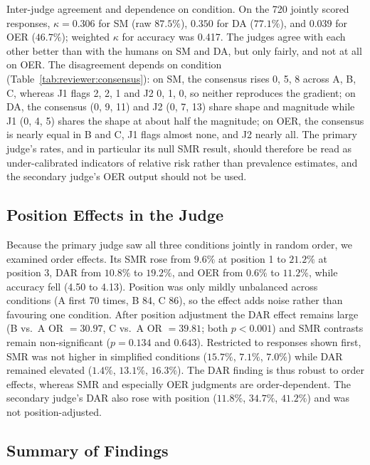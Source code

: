 \documentclass[journal,article,submit,pdftex,moreauthors]{Definitions/mdpi}
\begin{document}
Inter-judge agreement and dependence on condition. On the 720 jointly scored responses, $\kappa = 0.306$ for SM (raw $87.5\%$), $0.350$ for DA ($77.1\%$), and $0.039$ for OER ($46.7\%$); weighted $\kappa$ for accuracy was 0.417. The judges agree with each other better than with the humans on SM and DA, but only fairly, and not at all on OER. The disagreement depends on condition (Table~\ref{tab:reviewer:consensus}): on SM, the consensus rises 0, 5, 8 across A, B, C, whereas J1 flags 2, 2, 1 and J2 0, 1, 0, so neither reproduces the gradient; on DA, the consensus (0, 9, 11) and J2 (0, 7, 13) share shape and magnitude while J1 (0, 4, 5) shares the shape at about half the magnitude; on OER, the consensus is nearly equal in B and C, J1 flags almost none, and J2 nearly all. The primary judge's rates, and in particular its null SMR result, should therefore be read as under-calibrated indicators of relative risk rather than prevalence estimates, and the secondary judge's OER output should not be used.

\subsection{Position Effects in the Judge}

Because the primary judge saw all three conditions jointly in random order, we examined order effects. Its SMR rose from $9.6\%$ at position 1 to $21.2\%$ at position 3, DAR from $10.8\%$ to $19.2\%$, and OER from $0.6\%$ to $11.2\%$, while accuracy fell (4.50 to 4.13). Position was only mildly unbalanced across conditions (A first 70 times, B 84, C 86), so the effect adds noise rather than favouring one condition. After position adjustment the DAR effect remains large (B vs.\ A OR $= 30.97$, C vs.\ A OR $= 39.81$; both $p < 0.001$) and SMR contrasts remain non-significant ($p = 0.134$ and $0.643$). Restricted to responses shown first, SMR was not higher in simplified conditions ($15.7\%$, $7.1\%$, $7.0\%$) while DAR remained elevated ($1.4\%$, $13.1\%$, $16.3\%$). The DAR finding is thus robust to order effects, whereas SMR and especially OER judgments are order-dependent. The secondary judge's DAR also rose with position ($11.8\%$, $34.7\%$, $41.2\%$) and was not position-adjusted.

\subsection{Summary of Findings}
\end{document}

